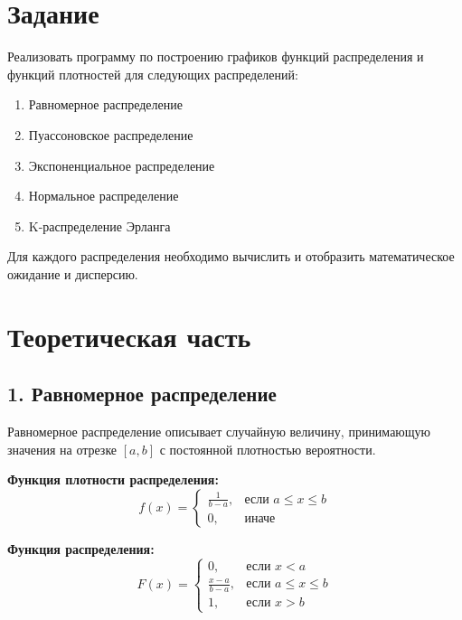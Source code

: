 \section*{Задание}

Реализовать программу по построению графиков функций распределения и функций плотностей для следующих распределений:
\begin{enumerate}
 \item Равномерное распределение
 \item Пуассоновское распределение
 \item Экспоненциальное распределение
 \item Нормальное распределение
 \item K-распределение Эрланга
\end{enumerate}

Для каждого распределения необходимо вычислить и отобразить математическое ожидание и дисперсию.

\newpage

\section*{Теоретическая часть}

\subsection*{1. Равномерное распределение}

Равномерное распределение описывает случайную величину, принимающую значения на отрезке $[a, b]$ с постоянной плотностью вероятности.

\textbf{Функция плотности распределения:}
\begin{equation}
f(x) = 
\begin{cases}
\frac{1}{b - a}, & \text{если } a \leq x \leq b \\
0, & \text{иначе}
\end{cases}
\end{equation}

\textbf{Функция распределения:}
\begin{equation}
F(x) = 
\begin{cases}
0, & \text{если } x < a \\
\frac{x - a}{b - a}, & \text{если } a \leq x \leq b \\
1, & \text{если } x > b
\end{cases}
\end{equation}

